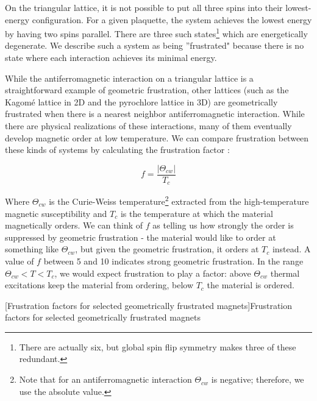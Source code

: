 On the triangular lattice, it is not possible to put all three spins into their lowest-energy configuration. For a given plaquette, the system achieves the lowest energy by having two spins parallel. There are three such states\footnote{There are actually six, but global spin flip symmetry makes three of these redundant.} which are energetically degenerate. We describe such a system as being ''frustrated" because there is no state where each interaction achieves its minimal energy.

While the antiferromagnetic interaction on a triangular lattice is a straightforward example of geometric frustration, other lattices (such as the Kagom{\'e} lattice in 2D and the pyrochlore lattice in 3D) are geometrically frustrated when there is a nearest neighbor antiferromagnetic interaction. While there are physical realizations of these interactions, many of them eventually develop magnetic order at low temperature. We can compare frustration between these kinds of systems by calculating the frustration factor \cite{Ramirez1994}:

\begin{equation}
f = \frac{|\Theta_{cw}|}{T_{c}}
\end{equation}

Where $\Theta_{cw}$ is the Curie-Weiss temperature\footnote{Note that for an antiferromagnetic interaction $\Theta_{cw}$ is negative; therefore, we use the absolute value.} extracted from the high-temperature magnetic susceptibility and $T_{c}$ is the temperature at which the material magnetically orders. We can think of $f$ as telling us how strongly the order is suppressed by geometric frustration - the material would like to order at something like $\Theta_{cw}$, but given the geometric frustration, it orders at $T_{c}$ instead. A value of $f$ between 5 and 10 indicates strong geometric frustration. In the range $\Theta_{cw} < T < T_{c}$, we would expect frustration to play a factor: above $\Theta_{cw}$ thermal excitations keep the material from ordering, below $T_{c}$ the material is ordered.

\begin{center}
	[Frustration factors for selected geometrically frustrated magnets]{Frustration factors for selected geometrically frustrated magnets \cite{Ramirez1994}}\label{tbl:frustratedmagens}
\end{center}

